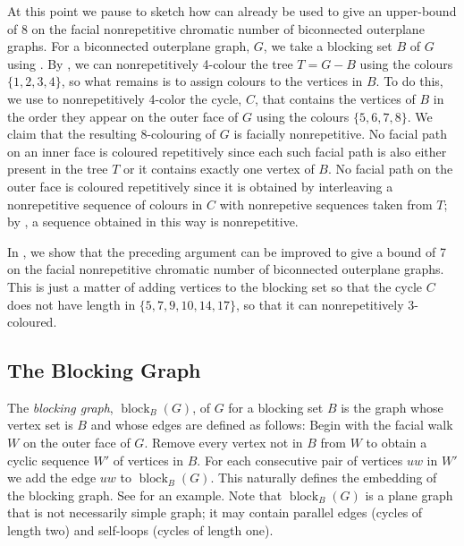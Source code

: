\documentclass{patmorin}
\DeclareMathOperator{\block}{block}
\begin{document}
At this point we pause to sketch how 
can already be used to give an upper-bound of 8 on the facial
nonrepetitive chromatic number of biconnected outerplane graphs.  For a
biconnected outerplane graph, $G$, we take a blocking set $B$ of $G$
using .  By , we can nonrepetitively
4-colour the tree $T=G-B$ using the colours $\{1,2,3,4\}$, so
what remains is to assign colours to the vertices in $B$.  To do this,
we use  to nonrepetitively 4-color the cycle, $C$, that
contains the vertices of $B$ in the order they appear on the outer face
of $G$ using the colours $\{5,6,7,8\}$.  We claim that the resulting
8-colouring of $G$ is facially nonrepetitive.  No facial path on an
inner face is coloured repetitively since each such facial path is also
either present in the tree $T$ or it contains exactly one vertex of $B$.
No facial path on the outer face is coloured repetitively since it is
obtained by interleaving a nonrepetitive sequence of colours in $C$
with nonrepetive sequences taken from $T$; by ,
a sequence obtained in this way is nonrepetitive.

In , we show that the preceding argument can be
improved to give a bound of 7 on the facial nonrepetitive chromatic
number of biconnected outerplane graphs. This is just a matter of adding
vertices to the blocking set so that the cycle $C$ does not have length
in $\{5,7,9,10,14,17\}$, so that it can nonrepetitively 3-coloured.

\subsection{The Blocking Graph}


The \emph{blocking graph}, $\block_B(G)$, of $G$ for a blocking set $B$ is
the graph whose vertex set is $B$ and whose edges are defined as follows:
Begin with the facial walk $W$ on the outer face of $G$. Remove every
vertex not in $B$ from $W$ to obtain a cyclic sequence $W'$ of vertices
in $B$. For each consecutive pair of vertices $uw$ in $W'$ we add the
edge $uw$ to $\block_B(G)$.  This naturally defines the embedding of the
blocking graph. See  for an example.   Note that
$\block_B(G)$ is a plane graph that is not necessarily simple graph;
it may contain parallel edges (cycles of length two) and self-loops
(cycles of length one).
\end{document}
